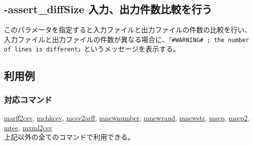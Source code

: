 

%

\subsection{-assert\_diffSize 入力、出力件数比較を行う\label{sect:option_assert_diffSize}}

このパラメータを指定すると入力ファイルと出力ファイルの件数の比較を行い、
入力ファイルと出力ファイルの件数が異なる場合に、\verb|「#WARNING# ; the number of lines is different」|というメッセージを表示する。

\subsection*{利用例}


\subsubsection*{対応コマンド}
\hyperref[sect:marff2csv]{marff2csv},
\hyperref[sect:mchkcsv]{mchkcsv},
\hyperref[sect:mcsv2arff]{mcsv2arff},
\hyperref[sect:mnewnumber]{mnewnumber},
\hyperref[sect:mnewrand]{mnewrand},
\hyperref[sect:mnewstr]{mnewstr},
\hyperref[sect:msep]{msep},
\hyperref[sect:msep2]{msep2},
\hyperref[sect:mtee]{mtee},
\hyperref[sect:mxml2csv]{mxml2csv}\\
上記以外の全てのコマンドで利用できる。

%
